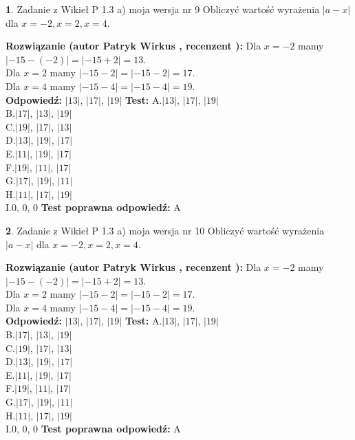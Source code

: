 \documentclass[12pt, a4paper]{article}
\theoremstyle{definition} %
\newtheorem{zad}{}
\newcommand{\zadStart}[1]{\begin{zad}#1\newline}
\newcommand{\zadStop}{\end{zad}}
\newcommand{\rozwStart}[2]{\noindent \textbf{Rozwiązanie (autor #1 , recenzent #2): }\newline}
\newcommand{\rozwStop}{\newline}
\newcommand{\odpStart}{\noindent \textbf{Odpowiedź:}\newline}
\newcommand{\odpStop}{\newline}
\newcommand{\testStart}{\noindent \textbf{Test:}\newline}
\newcommand{\testStop}{\newline}
\newcommand{\kluczStart}{\noindent \textbf{Test poprawna odpowiedź:}\newline}
\newcommand{\kluczStop}{\newline}
\begin{document}
\zadStart{Zadanie z Wikieł P 1.3 a) moja wersja nr 9}
Obliczyć wartość wyrażenia $|a - x|$ dla $x=-2,x=2,x=4$.
\zadStop
\rozwStart{Patryk Wirkus}{}
Dla $x = -2$ mamy $|-15 - (-2)| = |-15 + 2| = 13$.\\
Dla $x = 2$ mamy $|-15 - 2| = |-15 - 2| = 17$.\\
Dla $x = 4$ mamy $|-15 - 4| = |-15 - 4| = 19$.\\
\rozwStop
\odpStart
$|13|$, $|17|$, $|19|$
\odpStop
\testStart
A.$|13|$, $|17|$, $|19|$\\
B.$|17|$, $|13|$, $|19|$\\
C.$|19|$, $|17|$, $|13|$\\
D.$|13|$, $|19|$, $|17|$\\
E.$|11|$, $|19|$, $|17|$\\
F.$|19|$, $|11|$, $|17|$\\
G.$|17|$, $|19|$, $|11|$\\
H.$|11|$, $|17|$, $|19|$\\
I.$0$, $0$, $0$
\testStop
\kluczStart
A
\kluczStop



\zadStart{Zadanie z Wikieł P 1.3 a) moja wersja nr 10}
Obliczyć wartość wyrażenia $|a - x|$ dla $x=-2,x=2,x=4$.
\zadStop
\rozwStart{Patryk Wirkus}{}
Dla $x = -2$ mamy $|-15 - (-2)| = |-15 + 2| = 13$.\\
Dla $x = 2$ mamy $|-15 - 2| = |-15 - 2| = 17$.\\
Dla $x = 4$ mamy $|-15 - 4| = |-15 - 4| = 19$.\\
\rozwStop
\odpStart
$|13|$, $|17|$, $|19|$
\odpStop
\testStart
A.$|13|$, $|17|$, $|19|$\\
B.$|17|$, $|13|$, $|19|$\\
C.$|19|$, $|17|$, $|13|$\\
D.$|13|$, $|19|$, $|17|$\\
E.$|11|$, $|19|$, $|17|$\\
F.$|19|$, $|11|$, $|17|$\\
G.$|17|$, $|19|$, $|11|$\\
H.$|11|$, $|17|$, $|19|$\\
I.$0$, $0$, $0$
\testStop
\kluczStart
A
\kluczStop
\end{document}
